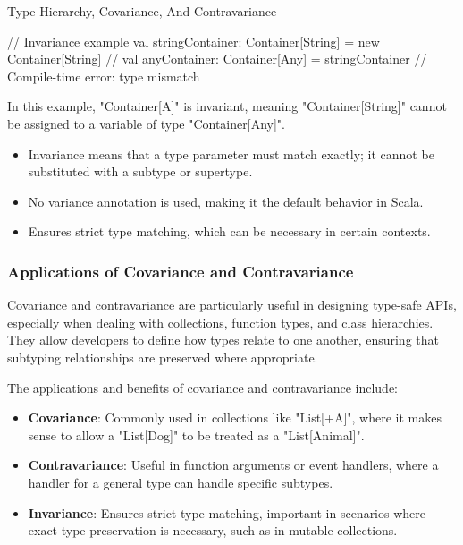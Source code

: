 \begin{notes}{Type Hierarchy, Covariance, And Contravariance}
\begin{highlight}[Invariance]
\begin{code}[Scala]
    // Invariance example
    val stringContainer: Container[String] = new Container[String]
    // val anyContainer: Container[Any] = stringContainer  // Compile-time error: type mismatch
    \end{code}
    
        In this example, "Container[A]" is invariant, meaning "Container[String]" cannot be assigned to a variable of type "Container[Any]".
    
        \begin{itemize}
            \item Invariance means that a type parameter must match exactly; it cannot be substituted with a subtype or supertype.
            \item No variance annotation is used, making it the default behavior in Scala.
            \item Ensures strict type matching, which can be necessary in certain contexts.
        \end{itemize}
    
    \end{highlight}
    
    \subsubsection*{Applications of Covariance and Contravariance}
    
    Covariance and contravariance are particularly useful in designing type-safe APIs, especially when dealing with collections, function types, and class hierarchies. They allow developers to define 
    how types relate to one another, ensuring that subtyping relationships are preserved where appropriate.
    
    \begin{highlight}
    
        The applications and benefits of covariance and contravariance include:
    
        \begin{itemize}
            \item \textbf{Covariance}: Commonly used in collections like "List[+A]", where it makes sense to allow a "List[Dog]" to be treated as a "List[Animal]".
            \item \textbf{Contravariance}: Useful in function arguments or event handlers, where a handler for a general type can handle specific subtypes.
            \item \textbf{Invariance}: Ensures strict type matching, important in scenarios where exact type preservation is necessary, such as in mutable collections.
        \end{itemize}
    

\end{highlight}
\end{notes}
